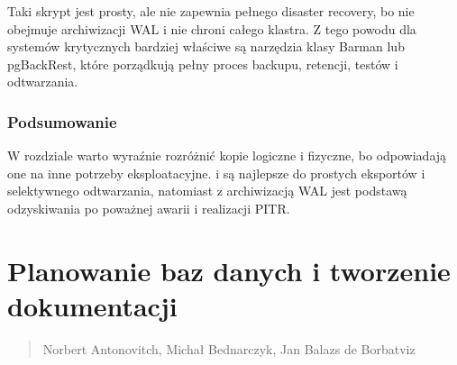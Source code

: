 \documentclass[a4paper,11pt,english,openany,oneside]{sphinxmanual}
\begin{document}
\sphinxAtStartPar
Taki skrypt jest prosty, ale nie zapewnia pełnego disaster recovery, bo nie obejmuje archiwizacji WAL i nie chroni całego klastra. Z tego powodu dla systemów krytycznych bardziej właściwe są narzędzia klasy Barman lub pgBackRest, które porządkują pełny proces backupu, retencji, testów i odtwarzania.


\subsection{Podsumowanie}
\label{\detokenize{rozdzial_2/rozdzial_28/index:podsumowanie}}
\sphinxAtStartPar
W rozdziale warto wyraźnie rozróżnić kopie logiczne i fizyczne, bo odpowiadają one na inne potrzeby eksploatacyjne.  i  są najlepsze do prostych eksportów i selektywnego odtwarzania, natomiast  z archiwizacją WAL jest podstawą odzyskiwania po poważnej awarii i realizacji PITR.

\sphinxstepscope


\chapter{Planowanie baz danych i tworzenie dokumentacji}
\label{\detokenize{rozdzial_3/index:planowanie-baz-danych-i-tworzenie-dokumentacji}}\label{\detokenize{rozdzial_3/index::doc}}\begin{quote}\begin{description}
\sphinxAtStartPar
Norbert Antonovitch, Michał Bednarczyk, Jan Balazs de Borbatviz

\end{description}\end{quote}
\end{document}
